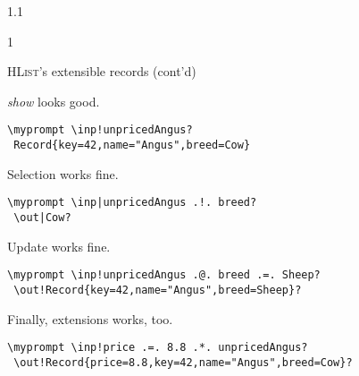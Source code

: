 \documentclass{slides}
\newenvironment{myslide}{\begin{slide}\color{Blue}\begin{boxedminipage}{1.1\hsize}\begin{boxedminipage}{1\hsize}\color{Black}
\vspace{-170\in}
}{%
\smallskip
\end{boxedminipage}
\end{boxedminipage}
\end{slide}}
\newenvironment{myslide}{\begin{slide}
}{%
\end{slide}}
\newenvironment{myslide}{\begin{slide}\color{White}\begin{boxedminipage}{1.1\hsize}\color{Black}
\vspace{-170\in}
}{%
\smallskip
\end{boxedminipage}
\end{slide}}
\newcommand{\header}[1]{{\large \color{Red} #1}}
\newcommand{\inp}[1]{{\color{Brown} \mytextbf{#1}}}
\newcommand{\out}[1]{{\color{Black} \mytextbf{#1}}}
\newcommand{\blau}[1]{{\vspace{-50\in}\normalsize \color{Blue} #1}}
\newcommand{\HList}{\textsc{HList}}
\newcommand{\myprompt}{ghci\ensuremath{>}}
\newcommand{\mytextbf}[1]{\texttt{\textbf{#1}}}
\begin{document}
\begin{myslide}

\header{\HList's extensible records (cont'd)}

\vspace{-77\in}

\blau{\emph{show} looks good.}

\smallskip

\begin{Verbatim}[fontfamily=courier,fontsize=\small,commandchars=\\\!\?]
 \myprompt \inp!unpricedAngus?
 Record{key=42,name="Angus",breed=Cow}
\end{Verbatim}

\vspace{-77\in}

\blau{Selection works fine.}

\begin{Verbatim}[fontfamily=courier,fontsize=\small,commandchars=\\\|\?]
 \myprompt \inp|unpricedAngus .!. breed?
 \out|Cow?
\end{Verbatim}

\vspace{-77\in}

\blau{Update works fine.}

\begin{Verbatim}[fontfamily=courier,fontsize=\small,commandchars=\\\!\?]
 \myprompt \inp!unpricedAngus .@. breed .=. Sheep?
 \out!Record{key=42,name="Angus",breed=Sheep}?
\end{Verbatim}

\vspace{-77\in}

\blau{Finally, extensions works, too.}

\begin{Verbatim}[fontfamily=courier,fontsize=\small,commandchars=\\\!\?]
 \myprompt \inp!price .=. 8.8 .*. unpricedAngus?
 \out!Record{price=8.8,key=42,name="Angus",breed=Cow}?
\end{Verbatim}

\end{myslide}



\end{document}
